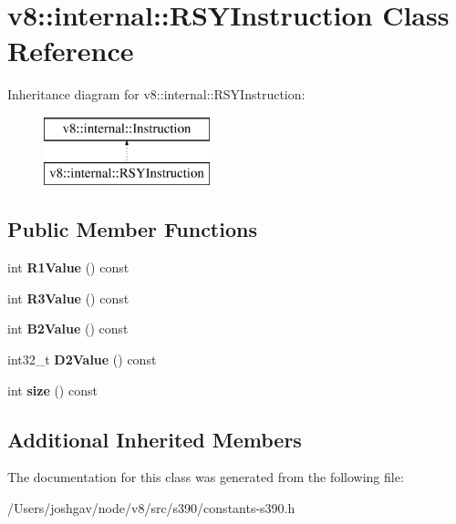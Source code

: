 \hypertarget{classv8_1_1internal_1_1_r_s_y_instruction}{}\section{v8\+:\+:internal\+:\+:R\+S\+Y\+Instruction Class Reference}
\label{classv8_1_1internal_1_1_r_s_y_instruction}
Inheritance diagram for v8\+:\+:internal\+:\+:R\+S\+Y\+Instruction\+:\begin{figure}[H]
\begin{center}
\leavevmode
\includegraphics[height=2.000000cm]{classv8_1_1internal_1_1_r_s_y_instruction}
\end{center}
\end{figure}
\subsection*{Public Member Functions}
\begin{DoxyCompactItemize}
\item 
int {\bfseries R1\+Value} () const \hypertarget{classv8_1_1internal_1_1_r_s_y_instruction_aad9d0c16285e0c2314e212b4c1efa2c4}{}\label{classv8_1_1internal_1_1_r_s_y_instruction_aad9d0c16285e0c2314e212b4c1efa2c4}

\item 
int {\bfseries R3\+Value} () const \hypertarget{classv8_1_1internal_1_1_r_s_y_instruction_acf785975afc40a4ca9e0c6a0ec19037d}{}\label{classv8_1_1internal_1_1_r_s_y_instruction_acf785975afc40a4ca9e0c6a0ec19037d}

\item 
int {\bfseries B2\+Value} () const \hypertarget{classv8_1_1internal_1_1_r_s_y_instruction_a556c7f2d91cf04047e7ab9aefdefa43f}{}\label{classv8_1_1internal_1_1_r_s_y_instruction_a556c7f2d91cf04047e7ab9aefdefa43f}

\item 
int32\+\_\+t {\bfseries D2\+Value} () const \hypertarget{classv8_1_1internal_1_1_r_s_y_instruction_a5fa1f7465fb22603053f5b1ccbba3ce4}{}\label{classv8_1_1internal_1_1_r_s_y_instruction_a5fa1f7465fb22603053f5b1ccbba3ce4}

\item 
int {\bfseries size} () const \hypertarget{classv8_1_1internal_1_1_r_s_y_instruction_abe560a774db56469f49c51a3ae1e2e31}{}\label{classv8_1_1internal_1_1_r_s_y_instruction_abe560a774db56469f49c51a3ae1e2e31}

\end{DoxyCompactItemize}
\subsection*{Additional Inherited Members}


The documentation for this class was generated from the following file\+:\begin{DoxyCompactItemize}
\item 
/\+Users/joshgav/node/v8/src/s390/constants-\/s390.\+h\end{DoxyCompactItemize}
